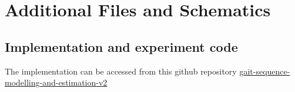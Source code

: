 \chapter{Additional Files and Schematics}

\section{Implementation and experiment code} \label{apdix-repo}
The implementation can be accessed from this github repository \href{https://github.com/h-kouame/gait-sequence-modelling-and-estimation-v2}{gait-sequence-modelling-and-estimation-v2}